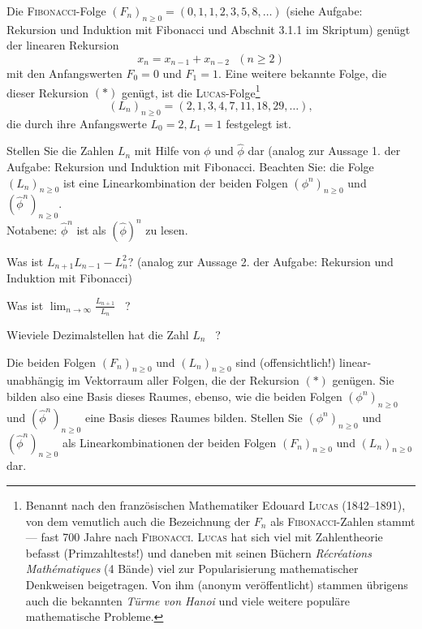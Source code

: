 Die \textsc{Fibonacci}-Folge $(F_n)_{n \geq 0} = (0,1,1,2,3,5,8,\ldots)$ (siehe Aufgabe: Rekursion und Induktion mit Fibonacci
und Abschnit 3.1.1 im Skriptum) genügt der linearen Rekursion
\begin{equation*}
x_{n} = x_{n-1} + x_{n-2}~~~(n \geq 2) \tag{$*$}
\end{equation*}
mit den Anfangswerten $F_0=0$ und $F_1=1$. Eine weitere bekannte Folge, die dieser Rekursion $(*)$
genügt, ist die \textsc{Lucas}-Folge\footnote{
Benannt nach den französischen Mathematiker Edouard \textsc{Lucas} (1842--1891), von dem
vemutlich auch die Bezeichnung der $F_n$ als \textsc{Fibonacci}-Zahlen stammt ---
fast 700 Jahre nach \textsc{Fibonacci}. 
\textsc{Lucas} hat sich viel mit Zahlentheorie befasst (Primzahltests!) und daneben mit seinen Büchern 
\emph{R\'ecr\'eations Math\'ematiques} (4 Bände) viel zur Popularisierung mathematischer
Denkweisen beigetragen. Von ihm (anonym veröffentlicht) stammen übrigens auch die 
bekannten \emph{Türme von Hanoi} und viele weitere populäre mathematische Probleme.}
\[
(L_n)_{n \geq 0} = (2,1,3,4,7,11,18,29, \ldots),
\]
die durch ihre Anfangswerte $L_0=2, L_1=1$ festgelegt ist.

\begin{flushenum}
\item Stellen Sie die Zahlen $L_n$ mit Hilfe von $\phi$ und $\widehat{\phi}$ dar (analog zur Aussage
	1. der Aufgabe: Rekursion und Induktion mit Fibonacci. Beachten Sie: die Folge $(L_n)_{n \geq 0}$ ist eine Linearkombination
	der beiden Folgen $(\phi^n)_{n \geq 0}$ und  $(\widehat{\phi}^n)_{n \geq 0}$.\\
	Notabene: $\widehat{\phi}^n$ ist als $\left( \widehat{\phi} \right)^n$ zu lesen.
\item Was ist $L_{n+1} L_{n-1} - L_n^2$? (analog  zur Aussage 2. der Aufgabe: Rekursion und Induktion mit Fibonacci)
\item Was ist $\lim_{n \rightarrow \infty} \frac{L_{n+1}}{L_n}$ ~?
\item Wieviele Dezimalstellen hat die Zahl $L_n$ ~?
\item Die beiden Folgen $(F_n)_{n \geq 0}$ und $(L_n)_{n \geq 0}$ sind (offensichtlich!)
	linear-unabhängig im Vektorraum aller Folgen, die der Rekursion $(*)$ genügen. 
	Sie bilden also eine Basis dieses Raumes, ebenso, wie die beiden
	Folgen $(\phi^n)_{n \geq 0}$ und $(\widehat{\phi}^n)_{n \geq 0}$ eine Basis dieses
	Raumes bilden. Stellen Sie  $(\phi^n)_{n \geq 0}$ und $(\widehat{\phi}^n)_{n \geq 0}$
	als Linearkombinationen der beiden Folgen $(F_n)_{n \geq 0}$ und $(L_n)_{n \geq 0}$ dar.
\end{flushenum}


